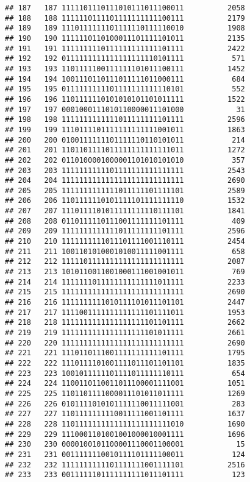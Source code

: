\documentclass[]{article}
\begin{document}
\begin{verbatim}
## 187   187 1111101110111010111011100011          2058
## 188   188 1111110111101111111111100111          2179
## 189   189 1110111111101111110111110010          1908
## 190   190 1111110110100011101111101011          2135
## 191   191 1111111110111111111111101111          2422
## 192   192 0111111111111111111110101111           571
## 193   193 1101111100111111101011100111          1452
## 194   194 1001110110111011111011000111           684
## 195   195 0111111111101111111111110101           552
## 196   196 1101111110101010101101011111          1522
## 197   197 0001000111010110000011101000            31
## 198   198 1111111111111011111111101111          2596
## 199   199 1110111101111111111111001011          1863
## 200   200 0100111111101111110110101011           214
## 201   201 1101101111011111111111111011          1272
## 202   202 0110100001000001101010101010           357
## 203   203 1111111111101111111111111111          2543
## 204   204 1111111111111111111111111111          2690
## 205   205 1111111111111011111101111101          2589
## 206   206 1101111110101111101111111110          1532
## 207   207 1110111101011111111110111101          1841
## 208   208 0110111110111001111111101111           409
## 209   209 1111111111111011111111101111          2596
## 210   210 1111111111011101111001110111          2454
## 211   211 1001101010001010011111001111           658
## 212   212 1111101111111111111111111111          2087
## 213   213 1010110011001000111001001011           769
## 214   214 1111111011111111111111011111          2233
## 215   215 1111111111111111111111111111          2690
## 216   216 1111111111010111101011101101          2447
## 217   217 1111001111111111111101111011          1953
## 218   218 1111111111111111111101101111          2662
## 219   219 1111111111111111111101011111          2661
## 220   220 1111111111111111111111111111          2690
## 221   221 1110110111001111111111101111          1795
## 222   222 1110111101001111011101101101          1835
## 223   223 1001011111101111011111110111           654
## 224   224 1100110110011011100001111001          1051
## 225   225 1101101111000011101011011111          1269
## 226   226 0101111010101111110011111001           283
## 227   227 1101111111110011111001101111          1637
## 228   228 1101111111111111111111111010          1690
## 229   229 1110001101001001000010001111          1696
## 230   230 0000100101100001110001100001            15
## 231   231 0011111110010111101111100011           124
## 232   232 1111111111101111111001111101          2516
## 233   233 0011111101111111111011101111           123

\end{verbatim}
\end{document}
